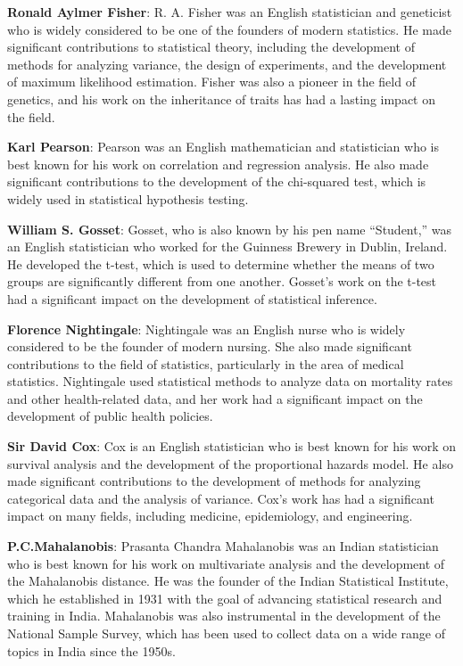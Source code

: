 \documentclass[
]{book}
\begin{document}
\textbf{Ronald Aylmer Fisher}: R. A. Fisher was an English statistician and geneticist who is widely considered to be one of the founders of modern statistics. He made significant contributions to statistical theory, including the development of methods for analyzing variance, the design of experiments, and the development of maximum likelihood estimation. Fisher was also a pioneer in the field of genetics, and his work on the inheritance of traits has had a lasting impact on the field.

\textbf{Karl Pearson}: Pearson was an English mathematician and statistician who is best known for his work on correlation and regression analysis. He also made significant contributions to the development of the chi-squared test, which is widely used in statistical hypothesis testing.

\textbf{William S. Gosset}: Gosset, who is also known by his pen name ``Student,'' was an English statistician who worked for the Guinness Brewery in Dublin, Ireland. He developed the t-test, which is used to determine whether the means of two groups are significantly different from one another. Gosset's work on the t-test had a significant impact on the development of statistical inference.

\textbf{Florence Nightingale}: Nightingale was an English nurse who is widely considered to be the founder of modern nursing. She also made significant contributions to the field of statistics, particularly in the area of medical statistics. Nightingale used statistical methods to analyze data on mortality rates and other health-related data, and her work had a significant impact on the development of public health policies.

\textbf{Sir David Cox}: Cox is an English statistician who is best known for his work on survival analysis and the development of the proportional hazards model. He also made significant contributions to the development of methods for analyzing categorical data and the analysis of variance. Cox's work has had a significant impact on many fields, including medicine, epidemiology, and engineering.

\textbf{P.C.Mahalanobis}: Prasanta Chandra Mahalanobis was an Indian statistician who is best known for his work on multivariate analysis and the development of the Mahalanobis distance. He was the founder of the Indian Statistical Institute, which he established in 1931 with the goal of advancing statistical research and training in India. Mahalanobis was also instrumental in the development of the National Sample Survey, which has been used to collect data on a wide range of topics in India since the 1950s.
\end{document}
